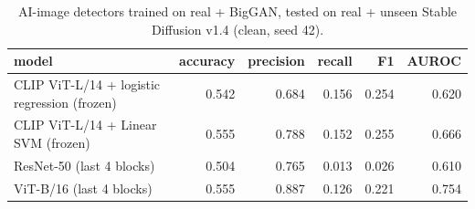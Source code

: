 \begin{table}[t]
\centering
\caption{AI-image detectors trained on real + BigGAN, tested on real + unseen Stable Diffusion v1.4 (clean, seed 42).}
\label{tab:tab_detectors}
\begin{tabular}{lrrrrr}
\toprule
model & accuracy & precision & recall & F1 & AUROC \\
\midrule
CLIP ViT-L/14 + logistic regression (frozen) & 0.542 & 0.684 & 0.156 & 0.254 & 0.620 \\
CLIP ViT-L/14 + Linear SVM (frozen) & 0.555 & 0.788 & 0.152 & 0.255 & 0.666 \\
ResNet-50 (last 4 blocks) & 0.504 & 0.765 & 0.013 & 0.026 & 0.610 \\
ViT-B/16 (last 4 blocks) & 0.555 & 0.887 & 0.126 & 0.221 & 0.754 \\
\bottomrule
\end{tabular}
\end{table}
